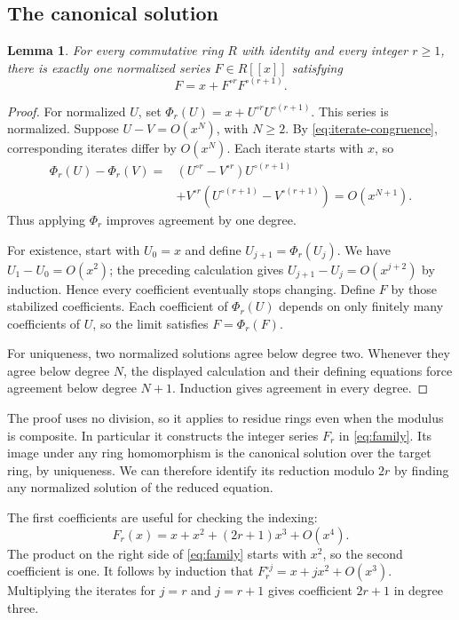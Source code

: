 \documentclass[11pt,a4paper]{article}
\newtheorem{lemma}[theorem]{Lemma}
\theoremstyle{remark}\newtheorem{remark}[theorem]{Remark}
\begin{document}
\subsection{The canonical solution}

\begin{lemma}\label{lem:unique}
For every commutative ring $R$ with identity and every integer $r\ge1$,
there is exactly one normalized series $F\in R[[x]]$ satisfying
\[
F=x+F^{\circ r}F^{\circ(r+1)}.
\]
\end{lemma}

\begin{proof}
For normalized $U$, set
$\Phi_r(U)=x+U^{\circ r}U^{\circ(r+1)}$.
This series is normalized. Suppose $U-V=O(x^N)$, with $N\ge2$.
By \eqref{eq:iterate-congruence}, corresponding iterates differ by
$O(x^N)$. Each iterate starts with $x$, so
\begin{align*}
\Phi_r(U)-\Phi_r(V)
={}&(U^{\circ r}-V^{\circ r})U^{\circ(r+1)}\\
&+V^{\circ r}(U^{\circ(r+1)}-V^{\circ(r+1)})
=O(x^{N+1}).
\end{align*}
Thus applying $\Phi_r$ improves agreement by one degree.

For existence, start with $U_0=x$ and define
$U_{j+1}=\Phi_r(U_j)$. We have $U_1-U_0=O(x^2)$; the preceding
calculation gives $U_{j+1}-U_j=O(x^{j+2})$ by induction. Hence every
coefficient eventually stops changing. Define $F$ by those stabilized
coefficients. Each coefficient of $\Phi_r(U)$ depends on only finitely
many coefficients of $U$, so the limit satisfies $F=\Phi_r(F)$.

For uniqueness, two normalized solutions agree below degree two.
Whenever they agree below degree $N$, the displayed calculation and
their defining equations force agreement below degree $N+1$.
Induction gives agreement in every degree.
\end{proof}

The proof uses no division, so it applies to residue rings even when
the modulus is composite. In particular it constructs the integer
series $F_r$ in \eqref{eq:family}. Its image under any ring
homomorphism is the canonical solution over the target ring, by
uniqueness. We can therefore identify its reduction modulo $2r$ by
finding any normalized solution of the reduced equation.

The first coefficients are useful for checking the indexing:
\begin{equation}\label{eq:firstcoeff}
F_r(x)=x+x^2+(2r+1)x^3+O(x^4).
\end{equation}
The product on the right side of \eqref{eq:family} starts with $x^2$,
so the second coefficient is one. It follows by induction that
$F_r^{\circ j}=x+jx^2+O(x^3)$. Multiplying the iterates for $j=r$
and $j=r+1$ gives coefficient $2r+1$ in degree three.
\end{document}
